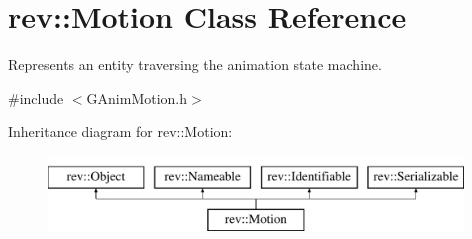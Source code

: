 \hypertarget{classrev_1_1_motion}{}\section{rev\+::Motion Class Reference}
\label{classrev_1_1_motion}


Represents an entity traversing the animation state machine.  




{\ttfamily \#include $<$G\+Anim\+Motion.\+h$>$}

Inheritance diagram for rev\+::Motion\+:\begin{figure}[H]
\begin{center}
\leavevmode
\includegraphics[height=2.000000cm]{classrev_1_1_motion}
\end{center}
\end{figure}
